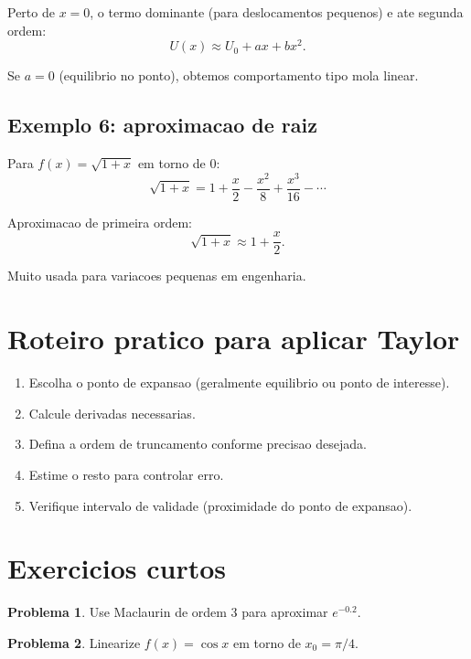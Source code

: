 \documentclass[12pt,a4paper,oneside]{book}
\theoremstyle{definition}
\newtheorem{problem}{Problema}
\begin{document}
Perto de $x=0$, o termo dominante (para deslocamentos pequenos) e ate segunda ordem:
\begin{equation}
U(x) \approx U_0 + ax + bx^2.
\end{equation}

Se $a=0$ (equilibrio no ponto), obtemos comportamento tipo mola linear.

\subsection{Exemplo 6: aproximacao de raiz}

Para $f(x)=\sqrt{1+x}$ em torno de $0$:
\begin{equation}
\sqrt{1+x}=1+\frac{x}{2}-\frac{x^2}{8}+\frac{x^3}{16}-\cdots
\end{equation}

Aproximacao de primeira ordem:
\begin{equation}
\sqrt{1+x}\approx 1+\frac{x}{2}.
\end{equation}

Muito usada para variacoes pequenas em engenharia.

\section{Roteiro pratico para aplicar Taylor}

\begin{enumerate}
    \item Escolha o ponto de expansao (geralmente equilibrio ou ponto de interesse).
    \item Calcule derivadas necessarias.
    \item Defina a ordem de truncamento conforme precisao desejada.
    \item Estime o resto para controlar erro.
    \item Verifique intervalo de validade (proximidade do ponto de expansao).
\end{enumerate}

\section{Exercicios curtos}

\begin{problem}
Use Maclaurin de ordem 3 para aproximar $e^{-0.2}$.
\end{problem}

\begin{problem}
Linearize $f(x)=\cos x$ em torno de $x_0=\pi/4$.
\end{problem}
\end{document}
